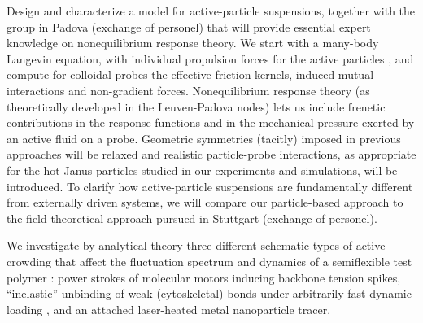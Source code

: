 \begin{workpackage}[id=WPactive,wphases=0-48,
  short=Active Particle Suspensions,%
  title=Probing active particle suspensions with colloids and polymers,
  lead=ULEI,
  ULEIRM=96,UNIPDRM=6,USTUTTRM=2]
\begin{tasklist}

\begin{task}[title=Nonequilibrium equations of state (NEOS),id=task1,lead=ULEI,partners={UNIPD,USTUTT},
wphases={0-48!0.5,24-30,36-38}]
Design and characterize a model for active-particle suspensions, together with the group
in Padova (exchange of personel) that will provide essential expert knowledge on
nonequilibrium response theory.
%
We start with a many-body Langevin equation, with individual propulsion forces for the
active particles \cite{solon-etal:2015}, and compute for colloidal probes the effective
friction kernels, induced mutual interactions and non-gradient forces.
%
Nonequilibrium response theory (as theoretically developed in the Leuven-Padova nodes) lets us include 
frenetic contributions in the response functions \cite{baiesi-wynants:2009} and in the mechanical pressure 
exerted by an active fluid on a probe. 
%
Geometric symmetries (tacitly) imposed in previous approaches will be relaxed and realistic particle-probe interactions, 
as appropriate for the hot Janus particles studied in our experiments and simulations, will be introduced.
%
To clarify how active-particle suspensions are fundamentally different from externally driven systems,
we will compare our particle-based approach to the field theoretical approach pursued in Stuttgart (exchange of personel). 

\end{task}

\begin{task}[title=Active Crowding,id=task2,lead=ULEI,partners={KUL},wphases=0-48!0.5]
We investigate by analytical theory three different schematic types of active crowding 
that affect the fluctuation spectrum and dynamics of a semiflexible test polymer \cite{otto-etal:2013}: 
power strokes of molecular motors inducing backbone tension spikes,
``inelastic'' \cite{gralka-kroy:2015}unbinding of weak (cytoskeletal) bonds under 
arbitrarily fast dynamic loading \cite{bullerjahn-sturm-kroy:2014}, and an attached laser-heated metal nanoparticle tracer.
\end{task}


\end{tasklist}
\end{workpackage}
